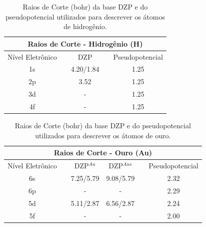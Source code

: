 \begin{table}[H]
	\centering
			\caption{Raios de Corte (bohr) da base DZP e do pseudopotencial utilizados para descrever os átomos de hidrogênio.\label{tab:h}}
	\begin{tabular}{clccc} 
		\hline\hline
		\multicolumn{5}{c}{Raios de Corte - Hidrogênio (H)}    \\ 
		\midrule
		Nível Eletrônico &  & DZP &  & Pseudopotencial  \\ 
		\midrule
		1s               &  & 4.20/1.84  &  & 1.25             \\
		2p               &  & 3.52       &  & 1.25             \\
		3d               &  & -          &  & 1.25             \\
		4f               &  & -          &  & 1.25             \\
		\hline\hline
	\end{tabular}
\end{table}

\begin{table}[H]
	\centering
	\caption{Raios de Corte (bohr) da base DZP e do pseudopotencial utilizados para descrever os átomos de ouro.\label{tab:au}}
	\begin{tabular}{clcccc} 
		\hline\hline
		\multicolumn{6}{c}{Raios de Corte - Ouro (Au)}                                                \\ 
		\midrule
		\multicolumn{1}{l}{Nível Eletrônico} &  & DZP$^{Au}$ & DZP$^{Aus}$ &  &      Pseudopotencial             \\ 
		\midrule
		6s                                   &  & 7.25/5.79  & 9.08/5.79   &  & 2.32             \\
		6p                                   &  & -          & -           &  & 2.29             \\
		5d                                   &  & 5.11/2.87  & 6.56/2.87   &  & 2.24             \\
		5f                                   &  & -          & -           &  & 2.00             \\
		\hline\hline
	\end{tabular}
\end{table}
